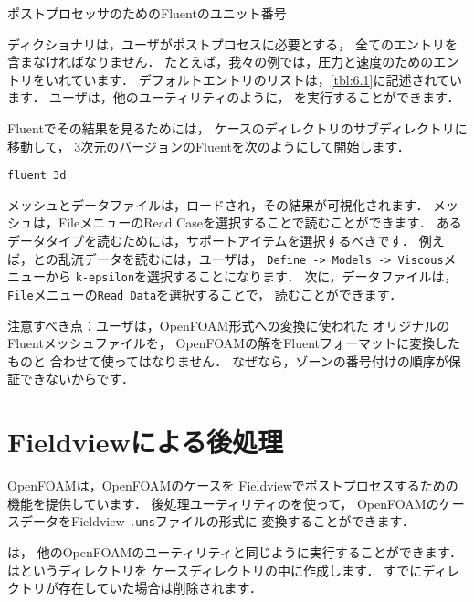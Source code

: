 \begin{table}[ht]
 
 \caption{ポストプロセッサのためのFluentのユニット番号}
 \label{tbl:6.1}
\end{table}


ディクショナリは，ユーザがポストプロセスに必要とする，
全てのエントリを含まなければなりません．
たとえば，我々の例では，圧力と速度のためのエントリをいれています．
デフォルトエントリのリストは，\autoref{tbl:6.1}に記述されています．
ユーザは，他のユーティリティのように，
を実行することができます．

Fluentでその結果を見るためには，
ケースのディレクトリのサブディレクトリに移動して，
3次元のバージョンのFluentを次のようにして開始します．
\begin{OFterminal}
\begin{verbatim}
fluent 3d
\end{verbatim}
\end{OFterminal}
メッシュとデータファイルは，ロードされ，その結果が可視化されます．
メッシュは，FileメニューのRead Caseを選択することで読むことができます．
あるデータタイプを読むためには，サポートアイテムを選択するべきです．
例えば，との乱流データを読むには，ユーザは，
\texttt{Define -> Models -> Viscous}メニューから
\texttt{k-epsilon}を選択することになります．
次に，データファイルは，\texttt{File}メニューの\texttt{Read Data}を選択することで，
読むことができます．

注意すべき点：ユーザは，OpenFOAM形式への変換に使われた
オリジナルのFluentメッシュファイルを，
OpenFOAMの解をFluentフォーマットに変換したものと
合わせて使ってはなりません．
なぜなら，ゾーンの番号付けの順序が保証できないからです．



\section{Fieldviewによる後処理}
\label{sec:6.3}
OpenFOAMは，OpenFOAMのケースを
Fieldviewでポストプロセスするための機能を提供しています．
後処理ユーティリティのを使って，
OpenFOAMのケースデータをFieldview \texttt{.uns}ファイルの形式に
変換することができます．

は，
他のOpenFOAMのユーティリティと同じように実行することができます．
はというディレクトリを
ケースディレクトリの中に作成します．
すでにディレクトリが存在していた場合は削除されます．

